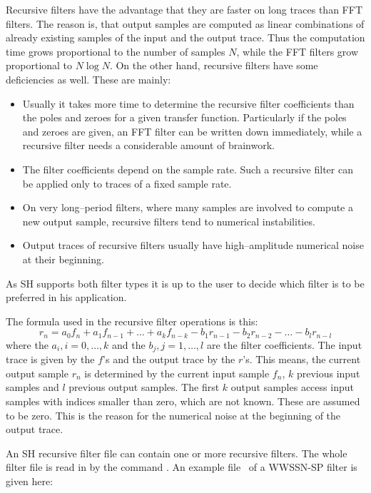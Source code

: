 Recursive filters have the advantage that they are faster on long
traces than FFT filters.  The reason is, that output samples are
computed as linear combinations of already existing samples of the
input and the output trace.  Thus the computation time grows
proportional to the number of samples $N$, while the FFT filters
grow proportional to $N\log N$.  On the other hand, recursive filters
have some deficiencies as well.  These are mainly:
\begin{itemize}
\item
   Usually it takes more time to determine the recursive filter
   coefficients than the poles and zeroes for a given transfer
   function.  Particularly if the poles and zeroes are given,
   an FFT filter can be written down immediately, while a recursive
   filter needs a considerable amount of brainwork.
\item
   The filter coefficients depend on the sample rate.  Such a
   recursive filter can be applied only to traces of a fixed
   sample rate.
\item
   On very long--period filters, where many samples are involved
   to compute a new output sample, recursive filters tend to
   numerical instabilities.
\item
   Output traces of recursive filters usually have high--amplitude
   numerical noise at their beginning.
\end{itemize}
As SH supports both filter types it is up to the user to decide
which filter is to be preferred in his application.

The formula used in the recursive filter operations is this:
\[
   r_n = a_0 f_n + a_1 f_{n-1} + \ldots + a_k f_{n-k} -
      b_1 r_{n-1} - b_2 r_{n-2} - \ldots - b_l r_{n-l}
\]
where the $a_i, i=0,\ldots,k$ and the $b_j, j=1,\ldots,l$ are the
filter coefficients.  The input trace is given by the $f$'s and
the output trace by the $r$'s.  This means, the current output
sample $r_n$ is determined by the current input sample $f_n$,
$k$ previous input samples and $l$ previous output samples.
The first $k$ output samples access input samples with indices
smaller than zero, which are not known.  These are assumed to
be zero.  This is the reason for the numerical noise at the beginning
of the output trace.

An SH recursive filter file can contain one or more recursive
filters.  The whole filter file is read in by the command
.  An example file \ of a
WWSSN-SP filter is given here:

